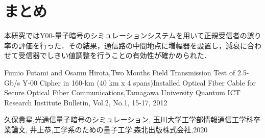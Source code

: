 \documentclass[a4j,twocolumn]{jarticle}
\begin{document}
\section{まとめ}
本研究ではY00-量子暗号のシミュレーションシステムを用いて正規受信者の誤り率の評価を行った．その結果，通信路の中間地点に増幅器を設置し，減衰に合わせて受信器でしきい値調整を行うことの有効性が確かめられた．



\begin{thebibliography}{9}
Fumio Futami and Osamu Hirota,Two Months Field
Transmission Test of 2.5-Gb/s Y-00 Cipher in 160-km (40 km x 4
spans)Installed Optical Fiber Cable for Secure Optical Fiber Communications,Tamagawa University Quantum ICT Research Institute Bulletin, Vol.2, No.1, 15-17, 2012 

久保貴星,光通信量子暗号のシミュレーション, 玉川大学工学部情報通信工学科卒業論文,
井上恭,工学系のための量子工学,森北出版株式会社,2020 
\end{thebibliography}
\end{document}
